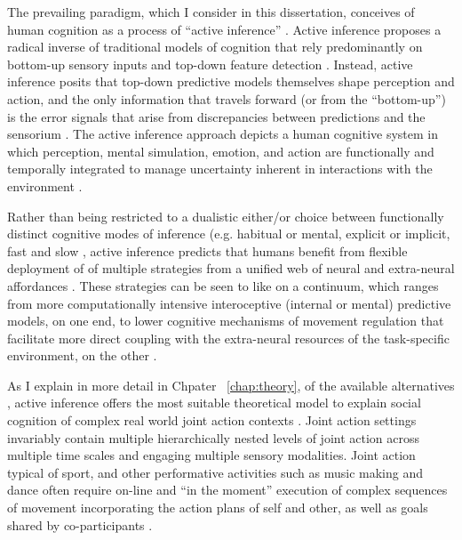 \begin{CJK}{UTF8}{gbsn}
The prevailing paradigm, which I consider in this dissertation, conceives of human cognition as a process of ``active inference'' \citep{Friston2010}.  Active inference \citep[and the predictive coding paradigm which it extends, see][]{Clark2013} proposes a radical inverse of traditional models of cognition that rely predominantly on bottom-up sensory inputs and top-down feature detection \citep{Marr1982}. Instead, active inference posits that top-down predictive models themselves shape perception and action, and the only information that travels forward (or from the ``bottom-up'') is the error signals that arise from discrepancies between predictions and the sensorium \citep{Clark2015}.  The active inference approach  depicts a human cognitive system in which perception, mental simulation, emotion, and action are functionally and temporally integrated to manage uncertainty inherent in interactions with the environment \citep{Clark2013}.

Rather than being restricted to a dualistic either/or choice between functionally distinct cognitive modes of inference (e.g. habitual or mental, explicit or implicit, fast and slow \citep[cf.][]{Dienes1999,Kahneman2011}, active inference predicts that humans benefit from flexible deployment of of multiple strategies from a unified web of neural and extra-neural affordances \citep{Pezzulo2013,Clark2015}.  These strategies can be seen to like on a continuum, which ranges from more computationally intensive interoceptive (internal or mental) predictive models, on one end, to lower cognitive mechanisms of movement regulation that facilitate more direct coupling with the extra-neural resources of the task-specific environment, on the other \citep{Riley2011}.

As I explain in more detail in Chpater ~\ref{chap:theory}, of the available alternatives \citep[see, for example,][]{Keller2016}, active inference offers the most suitable theoretical model to explain social cognition of complex real world joint action contexts \citep{Friston2015,Pesquita2017}.  Joint action settings invariably contain multiple hierarchically nested levels of joint action across multiple time scales and engaging multiple sensory modalities.  Joint action typical of sport, and other performative activities such as music making and dance often require on-line and ``in the moment'' execution of complex sequences of movement incorporating the action plans of self and other, as well as goals shared by co-participants \citep{Pesquita2017}.




\end{CJK}
